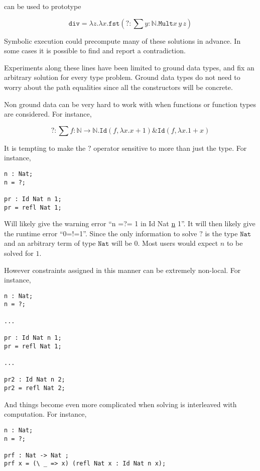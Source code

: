 can be used to prototype

\[
\mathtt{div}=\lambda z.\lambda x.\mathtt{fst}\left(?:\sum y:\mathbb{N}.\mathtt{Mult}x\,y\,z\right)
\]

Symbolic execution could precompute many of these solutions in advance.
In some cases it is possible to find and report a contradiction. 

Experiments along these lines have been limited to ground data types, and fix an arbitrary solution for every type problem.
Ground data types do not need to worry about the path equalities since all the constructors will be concrete.

Non ground data can be very hard to work with when functions or function types are considered. For instance,

\[
?:\sum f:\mathbb{N}\rightarrow\mathbb{N}.\mathtt{Id}\left(f,\lambda x.x+1\right)\&\mathtt{Id}\left(f,\lambda x.1+x\right)
\]

It is tempting to make the $?$ operator sensitive to more than just the type.
For instance,

\begin{lstlisting}
n : Nat;
n = ?;

pr : Id Nat n 1;
pr = refl Nat 1;
\end{lstlisting}

Will likely give the warning error ``n =?= 1 in Id Nat \uline{n} 1''.
It will then likely give the runtime error ``0=!=1''.
Since the only information to solve $\mathtt{?}$ is the type $\mathtt{Nat}$ and an arbitrary term of type $\mathtt{Nat}$ will be 0.
Most users would expect $n$ to be solved for $1$.

However constraints assigned in this manner can be extremely non-local.
For instance,

\begin{lstlisting}
n : Nat;
n = ?;

...

pr : Id Nat n 1;
pr = refl Nat 1;

...

pr2 : Id Nat n 2;
pr2 = refl Nat 2;
\end{lstlisting}

And things become even more complicated when solving is interleaved with computation.
For instance,

\begin{lstlisting}
n : Nat;
n = ?;

prf : Nat -> Nat ;
prf x = (\ _ => x) (refl Nat x : Id Nat n x);
\end{lstlisting}


